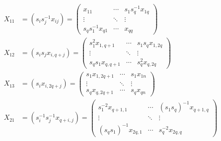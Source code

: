 \documentclass[12pt]{article}
\theoremstyle{definition}
\numberwithin{theorem}{subsection}
\newcommand{\lp}{\left(}
\newcommand{\rp}{\right)}
\newcommand{\inv}{^{-1}}
\begin{document}
\begin{align*}
	X_{11} &= \lp s_i s_j \inv x_{ij} \rp =
	\begin{pmatrix}
		x_{11} &  \cdots & s_1 s_q \inv x_{1q} \\
		\vdots & \ddots & \vdots  \\
		s_q s_1 \inv x_{q1} & \cdots & x_{qq}
	\end{pmatrix} \\
	X_{12} &= (s_i s_j x_{i,q+j}) =
	\begin{pmatrix}
		s_1^2 x_{1,q+1} & \cdots & s_1 s_q x_{1, 2q} \\
		\vdots & \ddots & \vdots \\
		 s_q s_1 x_{q,q+1} & \cdots & s_q^2 x_{q,2q} 
	\end{pmatrix} \\
	X_{13} &= (s_i x_{i,2q+j}) =
	\begin{pmatrix}
		s_1 x_{1, 2q+1} & \cdots & s_1 x_{1n} \\
		\vdots & \ddots & \vdots \\
		s_q x_{q, 2q+1} & \cdots & s_q x_{qn}
	\end{pmatrix}\\
	X_{21} &= \lp s_i \inv s_j \inv x_{q+i,j} \rp =
	\begin{pmatrix}
		s_1^{-2} x_{q+1, 1} & \cdots & (s_1 s_q) \inv x_{q+1, q} \\
		\vdots & \ddots & \vdots \\
		(s_q s_1) \inv x_{2q,1} & \cdots & s_q^{-2} x_{2q,q}
	\end{pmatrix} \\
\end{align*}
\end{document}
